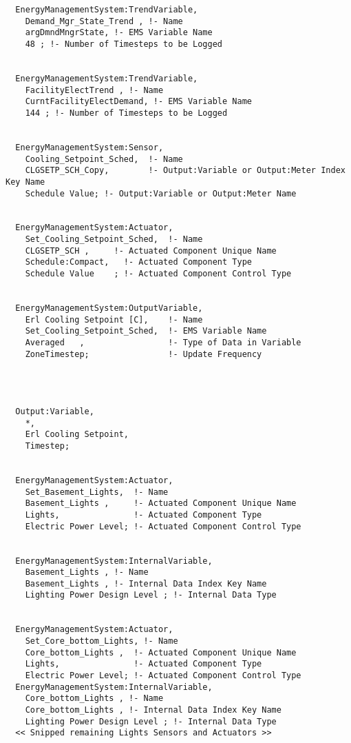 \begin{lstlisting}
  EnergyManagementSystem:TrendVariable,
    Demand_Mgr_State_Trend , !- Name
    argDmndMngrState, !- EMS Variable Name
    48 ; !- Number of Timesteps to be Logged


  EnergyManagementSystem:TrendVariable,
    FacilityElectTrend , !- Name
    CurntFacilityElectDemand, !- EMS Variable Name
    144 ; !- Number of Timesteps to be Logged


  EnergyManagementSystem:Sensor,
    Cooling_Setpoint_Sched,  !- Name
    CLGSETP_SCH_Copy,        !- Output:Variable or Output:Meter Index Key Name
    Schedule Value; !- Output:Variable or Output:Meter Name


  EnergyManagementSystem:Actuator,
    Set_Cooling_Setpoint_Sched,  !- Name
    CLGSETP_SCH ,     !- Actuated Component Unique Name
    Schedule:Compact,   !- Actuated Component Type
    Schedule Value    ; !- Actuated Component Control Type


  EnergyManagementSystem:OutputVariable,
    Erl Cooling Setpoint [C],    !- Name
    Set_Cooling_Setpoint_Sched,  !- EMS Variable Name
    Averaged   ,                 !- Type of Data in Variable
    ZoneTimestep;                !- Update Frequency




  Output:Variable,
    *,
    Erl Cooling Setpoint,
    Timestep;


  EnergyManagementSystem:Actuator,
    Set_Basement_Lights,  !- Name
    Basement_Lights ,     !- Actuated Component Unique Name
    Lights,               !- Actuated Component Type
    Electric Power Level; !- Actuated Component Control Type


  EnergyManagementSystem:InternalVariable,
    Basement_Lights , !- Name
    Basement_Lights , !- Internal Data Index Key Name
    Lighting Power Design Level ; !- Internal Data Type


  EnergyManagementSystem:Actuator,
    Set_Core_bottom_Lights, !- Name
    Core_bottom_Lights ,  !- Actuated Component Unique Name
    Lights,               !- Actuated Component Type
    Electric Power Level; !- Actuated Component Control Type
  EnergyManagementSystem:InternalVariable,
    Core_bottom_Lights , !- Name
    Core_bottom_Lights , !- Internal Data Index Key Name
    Lighting Power Design Level ; !- Internal Data Type
  << Snipped remaining Lights Sensors and Actuators >>
\end{lstlisting}
